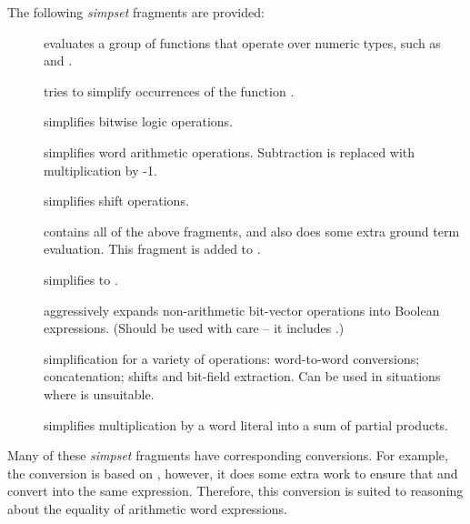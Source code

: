 The following \emph{simpset} fragments are provided:
\begin{description}
\item[] evaluates a group of functions that operate over numeric types, such as  and .
\item[] tries to simplify occurrences of the function .
\item[] simplifies bitwise logic operations.
\item[] simplifies word arithmetic operations.  Subtraction is replaced with multiplication by -1.
\item[] simplifies shift operations.
\item[] contains all of the above fragments, and also does some extra ground term evaluation.  This fragment is added to .
\item[] simplifies  to .
\item[] aggressively expands non-arithmetic bit-vector operations into Boolean expressions.  (Should be used with care -- it includes .)
\item[] simplification for a variety of operations: word-to-word conversions; concatenation; shifts and bit-field extraction.  Can be used in situations where  is unsuitable.
\item[] simplifies multiplication by a word literal into a sum of partial products.
\end{description}
Many of these \emph{simpset} fragments have corresponding conversions.  For example, the conversion  is based on , however, it does some extra work to ensure that  and  convert into the same expression.  Therefore, this conversion is suited to reasoning about the equality of arithmetic word expressions.

